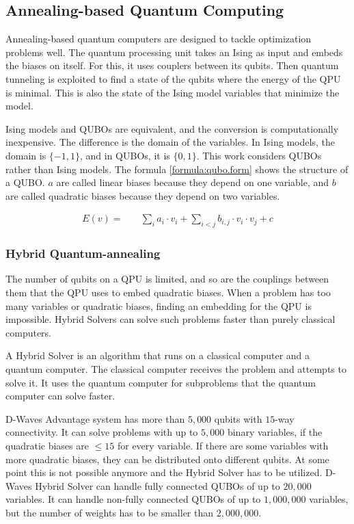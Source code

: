 \subsection{Annealing-based Quantum Computing}
\label{backg:annealing}

Annealing-based quantum computers are designed to tackle optimization problems well.
The quantum processing unit takes an Ising as input and embeds the biases on itself.
For this, it uses couplers between its qubits.
Then quantum tunneling is exploited to find a state of the qubits where the energy of the QPU is minimal.
This is also the state of the Ising model variables that minimize the model.
\cite{Boixo2013}

Ising models and QUBOs are equivalent, and the conversion is computationally inexpensive.
The difference is the domain of the variables.
\cite{Bian2010}
In Ising models, the domain is $\{-1, 1\}$, and in QUBOs, it is $\{0, 1\}$.
This work considers QUBOs rather than Ising models.
The formula \ref{formula:qubo.form} shows the structure of a QUBO.
$a$ are called linear biases because they depend on one variable, and $b$ are called quadratic biases because they depend on two variables.

\begin{align}
  \label{formula:qubo.form}
  E(v) = & \quad
  \sum_i a_i \cdot v_i
  + \sum_{i < j} b_{i, j} \cdot v_i \cdot v_j
  + c
\end{align}

\subsubsection{Hybrid Quantum-annealing}

The number of qubits on a QPU is limited, and so are the couplings between them that the QPU uses to embed quadratic biases.
When a problem has too many variables or quadratic biases, finding an embedding for the QPU is impossible.
Hybrid Solvers can solve such problems faster than purely classical computers.
\cite{Bernoudy2020}

A Hybrid Solver is an algorithm that runs on a classical computer and a quantum computer.
The classical computer receives the problem and attempts to solve it.
It uses the quantum computer for subproblems that the quantum computer can solve faster.
\cite{Zhang2016}

D-Waves Advantage system has more than $5, 000$ qubits with $15$-way connectivity.
\cite{D-Wave2020}
It can solve problems with up to $5, 000$ binary variables, if the quadratic biases are $\leq 15$ for every variable.
If there are some variables with more quadratic biases, they can be distributed onto different qubits.
At some point this is not possible anymore and the Hybrid Solver has to be utilized.
D-Waves Hybrid Solver can handle fully connected QUBOs of up to $20, 000$ variables.
It can handle non-fully connected QUBOs of up to $1, 000, 000$ variables, but the number of weights has to be smaller than $2, 000, 000$.
\cite{Bernoudy2020}

